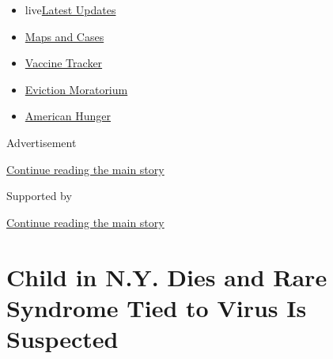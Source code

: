 \begin{itemize}
\tightlist
\item
  live\href{https://www.nytimes3xbfgragh.onion/2020/09/08/world/covid-19-coronavirus.html?name=styln-coronavirus-national\&region=TOP_BANNER\&block=storyline_menu_recirc\&action=click\&pgtype=Article\&impression_id=88072ab1-f1e4-11ea-b365-5d61fca58ac4\&variant=undefined}{Latest
  Updates}
\item
  \href{https://www.nytimes3xbfgragh.onion/interactive/2020/us/coronavirus-us-cases.html?name=styln-coronavirus-national\&region=TOP_BANNER\&block=storyline_menu_recirc\&action=click\&pgtype=Article\&impression_id=88072ab2-f1e4-11ea-b365-5d61fca58ac4\&variant=undefined}{Maps
  and Cases}
\item
  \href{https://www.nytimes3xbfgragh.onion/interactive/2020/science/coronavirus-vaccine-tracker.html?name=styln-coronavirus-national\&region=TOP_BANNER\&block=storyline_menu_recirc\&action=click\&pgtype=Article\&impression_id=88072ab3-f1e4-11ea-b365-5d61fca58ac4\&variant=undefined}{Vaccine
  Tracker}
\item
  \href{https://www.nytimes3xbfgragh.onion/2020/09/02/your-money/eviction-moratorium-covid.html?name=styln-coronavirus-national\&region=TOP_BANNER\&block=storyline_menu_recirc\&action=click\&pgtype=Article\&impression_id=88072ab4-f1e4-11ea-b365-5d61fca58ac4\&variant=undefined}{Eviction
  Moratorium}
\item
  \href{https://www.nytimes3xbfgragh.onion/interactive/2020/09/02/magazine/food-insecurity-hunger-us.html?name=styln-coronavirus-national\&region=TOP_BANNER\&block=storyline_menu_recirc\&action=click\&pgtype=Article\&impression_id=88072ab5-f1e4-11ea-b365-5d61fca58ac4\&variant=undefined}{American
  Hunger}
\end{itemize}

Advertisement

\protect\hyperlink{after-top}{Continue reading the main story}

Supported by

\protect\hyperlink{after-sponsor}{Continue reading the main story}

\hypertarget{child-in-ny-dies-and-rare-syndrome-tied-to-virus-is-suspected}{%
\section{Child in N.Y. Dies and Rare Syndrome Tied to Virus Is
Suspected}\label{child-in-ny-dies-and-rare-syndrome-tied-to-virus-is-suspected}}

